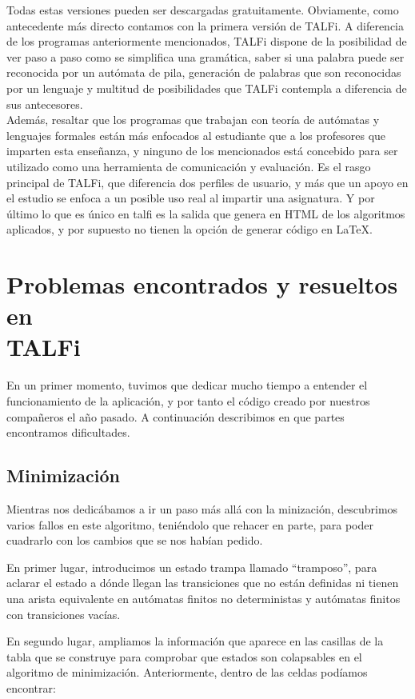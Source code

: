 \documentclass[12pt,a4paper,spanish]{book}
\begin{document}
Todas estas versiones pueden ser descargadas gratuitamente.
Obviamente, como antecedente m\'as directo contamos con la primera versi\'on de TALFi.
A diferencia de los programas anteriormente mencionados, TALFi dispone de la posibilidad de ver paso a paso como se simplifica una gram\'atica, saber si una palabra puede ser reconocida por un aut\'omata de pila, generaci\'on de palabras que son reconocidas por un lenguaje y multitud de posibilidades que TALFi contempla a diferencia de sus antecesores.\\
Adem\'as, resaltar que los programas que trabajan con teor\'ia de aut\'omatas y lenguajes formales est\'an m\'as enfocados al estudiante que a los profesores que imparten esta ense\~{n}anza, y ninguno de los mencionados est\'a concebido para ser utilizado como una herramienta de comunicaci\'on y evaluaci\'on. Es el rasgo principal de TALFi, que diferencia dos perfiles de usuario, y m\'as que un apoyo en el estudio se enfoca a un posible uso real al impartir una asignatura. Y por \'ultimo lo que es \'unico en talfi es la salida que genera en HTML de los algoritmos aplicados, y por supuesto no tienen la opci\'on de generar c\'odigo en \LaTeX{}.

\section{Problemas encontrados y resueltos en\\
TALFi}
En un primer momento, tuvimos que dedicar mucho tiempo a entender el funcionamiento de la aplicaci\'on, y por tanto el c\'odigo creado por nuestros compa\~neros el a\~no pasado. A continuaci\'on describimos en que partes encontramos dificultades.

\subsection{Minimizaci\'on}

Mientras nos dedic\'abamos a ir un paso m\'as all\'a con la minizaci\'on, descubrimos varios fallos en este algoritmo, teni\'endolo que rehacer en parte, para poder cuadrarlo con los cambios que se nos hab\'ian pedido.

En primer lugar, introducimos un estado trampa llamado ``tramposo'', para aclarar el estado a d\'onde llegan las transiciones que no est\'an definidas ni tienen una arista equivalente en aut\'omatas finitos no deterministas y aut\'omatas finitos con transiciones vac\'ias.

En segundo lugar, ampliamos la informaci\'on que aparece en las casillas de la tabla que se construye para comprobar que estados son colapsables en el algoritmo de minimizaci\'on. Anteriormente, dentro de las celdas pod\'iamos encontrar:
\end{document}
